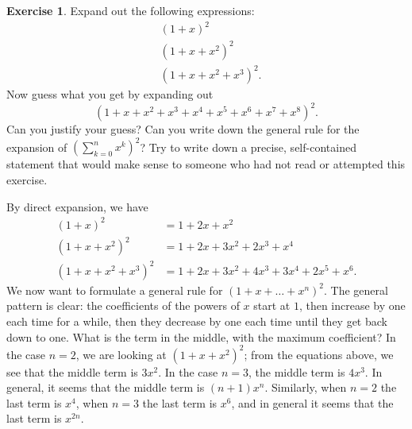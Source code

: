 \documentclass[a4paper]{book}
\theoremstyle{definition}
\newtheorem{exercise}[theorem]{Exercise}
\renewenvironment{solution}{\SolutionInline}{\endSolutionInline}
\begin{document}
\begin{exercise}
 Expand out the following expressions:
 \begin{align*}
  & (1 + x)^2 \\
  & (1 + x + x^2)^2 \\
  & (1 + x + x^2 + x^3)^2.
 \end{align*}
 Now guess what you get by expanding out
 \[ (1 + x + x^2 + x^3 + x^4 + x^5 + x^6 + x^7 + x^8)^2. \]
 Can you justify your guess?  Can you write down the general rule for
 the expansion of $(\sum_{k=0}^n x^k)^2$?  Try to write down a
 precise, self-contained statement that would make sense to someone
 who had not read or attempted this exercise.
\end{exercise}
\begin{solution}
 By direct expansion, we have
 \begin{align*}
  (1 + x)^2 &= 1 + 2x + x^2 \\
  (1 + x + x^2)^2 &= 1 + 2x + 3x^2 + 2x^3 + x^4 \\
  (1 + x + x^2 + x^3)^2 &= 1 + 2x + 3x^2 + 4x^3 + 3x^4 + 2x^5 + x^6.
 \end{align*}
 We now want to formulate a general rule for $(1+x+\ldots+x^n)^2$.  The general
 pattern is clear: the coefficients of the powers of $x$ start at $1$, then
 increase by one each time for a while, then they decrease by one each time
 until they get back down to one.  What is the term in the middle, with the
 maximum coefficient?  In the case $n=2$, we are looking at $(1+x+x^2)^2$; from
 the equations above, we see that the middle term is $3x^2$.  In the case $n=3$,
 the middle term is $4x^3$.  In general, it seems that the middle term is
 $(n+1)x^n$.  Similarly, when $n=2$ the last term is $x^4$, when $n=3$ the last
 term is $x^6$, and in general it seems that the last term is $x^{2n}$.


\end{solution}
\end{document}
